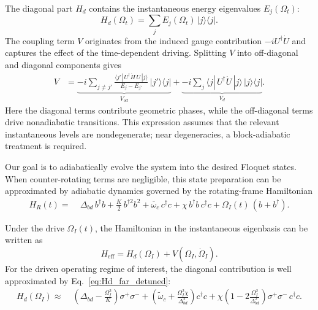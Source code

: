 \begin{appendices}
The diagonal part $H_d$ contains the instantaneous energy eigenvalues $E_j(\Omega_t)$:
\begin{equation}
H_d(\Omega_t)
=
\sum_j E_j(\Omega_t)\,|j\rangle\langle j|.
\end{equation}
The coupling term $V$ originates from the induced gauge contribution $-iU^\dagger\dot U$ and captures the effect of the time-dependent driving. Splitting $V$ into off-diagonal and diagonal components gives
\begin{equation}
\begin{aligned}
\label{Vexpression}
V
&=
\underbrace{
-i \sum_{j\neq j'}
\frac{
\langle j'|\,U^\dagger \dot H\,U\,|j\rangle
}{
E_j-E_{j'}
}
\,|j'\rangle\langle j|
}_{V_{od}}
+
\underbrace{
-i \sum_j
\langle j|\,U^\dagger \dot U\,|j\rangle
\,|j\rangle\langle j|
}_{V_d}.
\end{aligned}
\end{equation}
Here the diagonal terms contribute geometric phases, while the off-diagonal terms drive nonadiabatic transitions. This expression assumes that the relevant instantaneous levels are nondegenerate; near degeneracies, a block-adiabatic treatment is required.

Our goal is to adiabatically evolve the system into the desired Floquet states. When counter-rotating terms are negligible, this state preparation can be approximated by adiabatic dynamics governed by the rotating-frame Hamiltonian
\begin{equation}
\begin{aligned}
H_R(t) =\;&
\Delta_{bd}\, b^\dagger b
+ \frac{K}{2}\, b^{\dagger 2} b^{2}
+ \overline{\omega}_c\, c^\dagger c + \chi\, b^\dagger b\, c^\dagger c
+ \Omega_I(t)\, ( b + b^\dagger ) .
\end{aligned}
\end{equation}

Under the drive $\Omega_I(t)$, the Hamiltonian in the instantaneous eigenbasis can be written as
\begin{equation}
H_{\mathrm{eff}} = H_d(\Omega_I)+V(\Omega_I,\dot{\Omega}_I).
\end{equation}
For the driven operating regime of interest, the diagonal contribution is well approximated by Eq.~\eqref{eq:Hd_far_detuned}:
\begin{equation}
\begin{aligned}
H_d(\Omega_I) \approx\;&
\left( \Delta_{bd} - \frac{\Omega_I^2}{K} \right) \sigma^+ \sigma^-
+ \left( \tilde{\omega}_c + \frac{\Omega_I^2 \chi}{\Delta_{bd}^2} \right) c^\dagger c + \chi \left( 1 - 2 \frac{\Omega_I^2}{\Delta_{bd}^2} \right) \sigma^+ \sigma^-\, c^\dagger c .
\end{aligned}
\end{equation}


\end{appendices}
